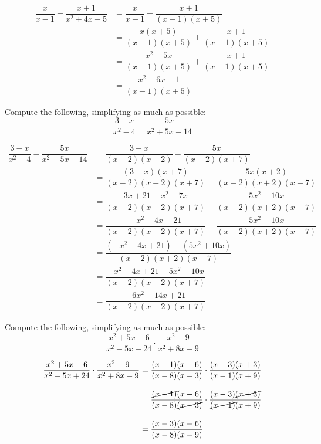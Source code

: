 \documentclass[11pt,letterpaper]{article}
\begin{document}
\sol
	\[
	\begin{aligned}
	\dfrac{x}{x - 1} + \dfrac{x + 1}{x^2 + 4x - 5}&= \dfrac{x}{x - 1} + \dfrac{x + 1}{(x - 1)(x + 5)} \\[0.3cm]
	&= \dfrac{x(x + 5)}{(x - 1)(x + 5)} + \dfrac{x + 1}{(x - 1)(x + 5)} \\[0.3cm]
	&= \dfrac{x^2 + 5x}{(x - 1)(x + 5)} + \dfrac{x + 1}{(x - 1)(x + 5)} \\[0.3cm]
	&= \dfrac{x^2 + 6x + 1}{(x - 1)(x + 5)} 
	\end{aligned}
	\]



\newpage



 Compute the following, simplifying as much as possible:
	\[
	\dfrac{3 - x}{x^2 - 4} - \dfrac{5x}{x^2 + 5x -14}
	\] \pspace

\sol
	\[
	\begin{aligned}
	\dfrac{3 - x}{x^2 - 4} - \dfrac{5x}{x^2 + 5x -14}&= \dfrac{3 - x}{(x - 2)(x + 2)} - \dfrac{5x}{(x - 2)(x + 7)} \\[0.3cm]
	&= \dfrac{(3 - x)(x + 7)}{(x - 2)(x + 2)(x + 7)} - \dfrac{5x(x + 2)}{(x - 2)(x + 2)(x + 7)} \\[0.3cm]
	&= \dfrac{3x + 21 - x^2 - 7x}{(x - 2)(x + 2)(x + 7)} - \dfrac{5x^2 + 10x}{(x - 2)(x + 2)(x + 7)} \\[0.3cm]
	&= \dfrac{-x^2 - 4x + 21}{(x - 2)(x + 2)(x + 7)} - \dfrac{5x^2 + 10x}{(x - 2)(x + 2)(x + 7)} \\[0.3cm]
	&= \dfrac{(-x^2 - 4x + 21) - (5x^2 + 10x)}{(x - 2)(x + 2)(x + 7)} \\[0.3cm]
	&= \dfrac{-x^2 - 4x + 21 - 5x^2 - 10x}{(x - 2)(x + 2)(x + 7)} \\[0.3cm]
	&= \dfrac{-6x^2 - 14x + 21}{(x - 2)(x + 2)(x + 7)} 
	\end{aligned}
	\]



\newpage



 Compute the following, simplifying as much as possible:
	\[
	\dfrac{x^2 + 5x - 6}{x^2 -5x + 24} \cdot \dfrac{x^2 - 9}{x^2 + 8x - 9}
	\] \pspace

\sol
	\[
	\begin{aligned}
	\dfrac{x^2 + 5x - 6}{x^2 -5x + 24} \cdot \dfrac{x^2 - 9}{x^2 + 8x - 9}&= \dfrac{(x - 1)(x + 6)}{(x - 8)(x + 3)} \cdot \dfrac{(x - 3)(x + 3)}{(x - 1)(x + 9)} \\[0.3cm]
	&= \dfrac{\cancel{(x - 1)}(x + 6)}{(x - 8)\cancel{(x + 3)}} \cdot \dfrac{(x - 3)\cancel{(x + 3)}}{\cancel{(x - 1)}(x + 9)} \\[0.3cm]
	&= \dfrac{(x - 3)(x + 6)}{(x - 8)(x + 9)}
	\end{aligned}
	\]
\end{document}
